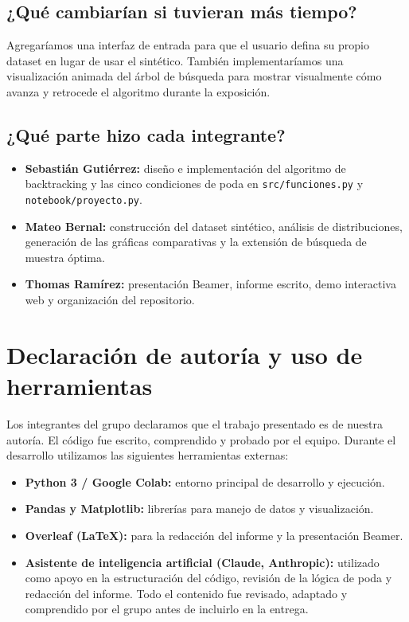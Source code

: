 \documentclass[12pt, a4paper]{article}
\begin{document}
\subsection*{¿Qué cambiarían si tuvieran más tiempo?}
Agregaríamos una interfaz de entrada para que el usuario defina su propio dataset en lugar de usar el sintético. También implementaríamos una visualización animada del árbol de búsqueda para mostrar visualmente cómo avanza y retrocede el algoritmo durante la exposición.

\subsection*{¿Qué parte hizo cada integrante?}
\begin{itemize}[noitemsep]
  \item \textbf{Sebastián Gutiérrez:} diseño e implementación del algoritmo de backtracking y las cinco condiciones de poda en \texttt{src/funciones.py} y \texttt{notebook/proyecto.py}.
  \item \textbf{Mateo Bernal:} construcción del dataset sintético, análisis de distribuciones, generación de las gráficas comparativas y la extensión de búsqueda de muestra óptima.
  \item \textbf{Thomas Ramírez:} presentación Beamer, informe escrito, demo interactiva web y organización del repositorio.
\end{itemize}

\section*{Declaración de autoría y uso de herramientas}

Los integrantes del grupo declaramos que el trabajo presentado es de nuestra autoría. El código fue escrito, comprendido y probado por el equipo. Durante el desarrollo utilizamos las siguientes herramientas externas:

\begin{itemize}[noitemsep]
  \item \textbf{Python 3 / Google Colab:} entorno principal de desarrollo y ejecución.
  \item \textbf{Pandas y Matplotlib:} librerías para manejo de datos y visualización.
  \item \textbf{Overleaf (LaTeX):} para la redacción del informe y la presentación Beamer.
  \item \textbf{Asistente de inteligencia artificial (Claude, Anthropic):} utilizado como apoyo en la estructuración del código, revisión de la lógica de poda y redacción del informe. Todo el contenido fue revisado, adaptado y comprendido por el grupo antes de incluirlo en la entrega.
\end{itemize}
\end{document}
